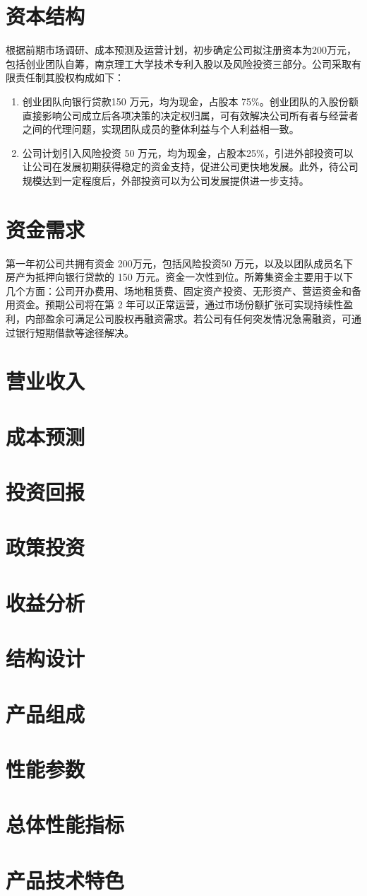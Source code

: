 \documentclass[violet]{main}
\begin{document}
		\section{资本结构}
			根据前期市场调研、成本预测及运营计划，初步确定公司拟注册资本为200万元，包括创业团队自筹，南京理工大学技术专利入股以及风险投资三部分。公司采取有限责任制其股权构成如下：
			\begin{enumerate}
				\item 创业团队向银行贷款150 万元，均为现金，占股本 75\%。创业团队的入股份额直接影响公司成立后各项决策的决定权归属，可有效解决公司所有者与经营者之间的代理问题，实现团队成员的整体利益与个人利益相一致。
				\item 公司计划引入风险投资 50 万元，均为现金，占股本25\%，引进外部投资可以让公司在发展初期获得稳定的资金支持，促进公司更快地发展。此外，待公司规模达到一定程度后，外部投资可以为公司发展提供进一步支持。
			\end{enumerate}
		\section{资金需求}
			第一年初公司共拥有资金 200万元，包括风险投资50 万元，以及以团队成员名下房产为抵押向银行贷款的 150 万元。资金一次性到位。所筹集资金主要用于以下几个方面：公司开办费用、场地租赁费、固定资产投资、无形资产、营运资金和备用资金。预期公司将在第 2 年可以正常运营，通过市场份额扩张可实现持续性盈利，内部盈余可满足公司股权再融资需求。若公司有任何突发情况急需融资，可通过银行短期借款等途径解决。
		\section{营业收入}
		\section{成本预测}
		\section{投资回报}
		\section{政策投资}
		\section{收益分析}
		\section{结构设计}
		\section{产品组成}
		\section{性能参数}
		\section{总体性能指标}
		\section{产品技术特色}
	\makebackcover
\end{document}
